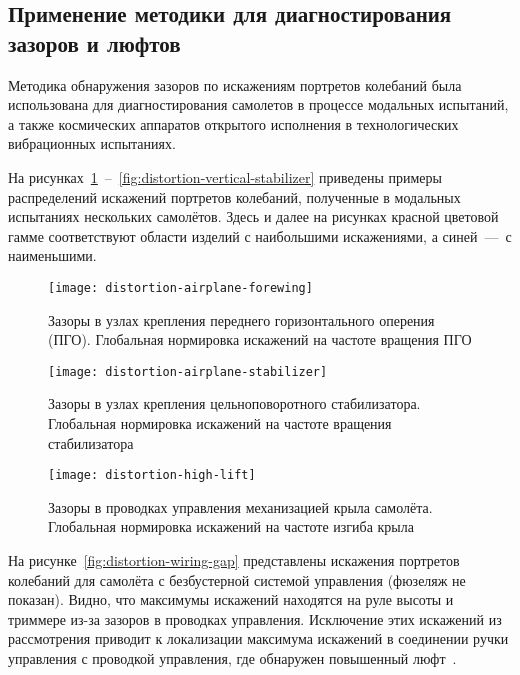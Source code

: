 \subsection{Применение методики для диагностирования зазоров и люфтов}

Методика обнаружения зазоров по искажениям портретов колебаний была использована для диагностирования самолетов в процессе модальных испытаний, а также космических аппаратов открытого исполнения в технологических вибрационных испытаниях. 

На рисунках~\ref{fig:distortion-airplane-forewing}~--~\ref{fig:distortion-vertical-stabilizer} приведены примеры распределений искажений портретов колебаний, полученные в модальных испытаниях нескольких самолётов. Здесь и далее на рисунках красной цветовой гамме соответствуют области изделий с наибольшими искажениями, а синей~---~с наименьшими. 

\begin{figure}[!htb]
	\centerfloat
	\texttt{[image: distortion-airplane-forewing]}
	\caption{Зазоры в узлах крепления переднего горизонтального оперения (ПГО). Глобальная нормировка искажений на частоте вращения ПГО} \label{fig:distortion-airplane-forewing}
\end{figure}

\begin{figure}[!htb]
	\centerfloat
	\texttt{[image: distortion-airplane-stabilizer]}
	\caption{Зазоры в узлах крепления цельноповоротного стабилизатора. Глобальная нормировка искажений на частоте вращения стабилизатора} \label{fig:distortion-airplane-stabilizer}
\end{figure}

\begin{figure}[!htb]
	\centerfloat
	\texttt{[image: distortion-high-lift]}
	\caption{Зазоры в проводках управления механизацией крыла самолёта. Глобальная нормировка искажений на частоте изгиба крыла} \label{fig:distortion-high-lift}
\end{figure}

На рисунке~\ref{fig:distortion-wiring-gap} представлены искажения портретов колебаний для самолёта с безбустерной системой управления (фюзеляж не показан). Видно, что максимумы искажений находятся на руле высоты и триммере из-за зазоров в проводках управления. Исключение этих искажений из рассмотрения приводит к локализации максимума искажений в соединении ручки управления с проводкой управления, где обнаружен повышенный люфт~.

